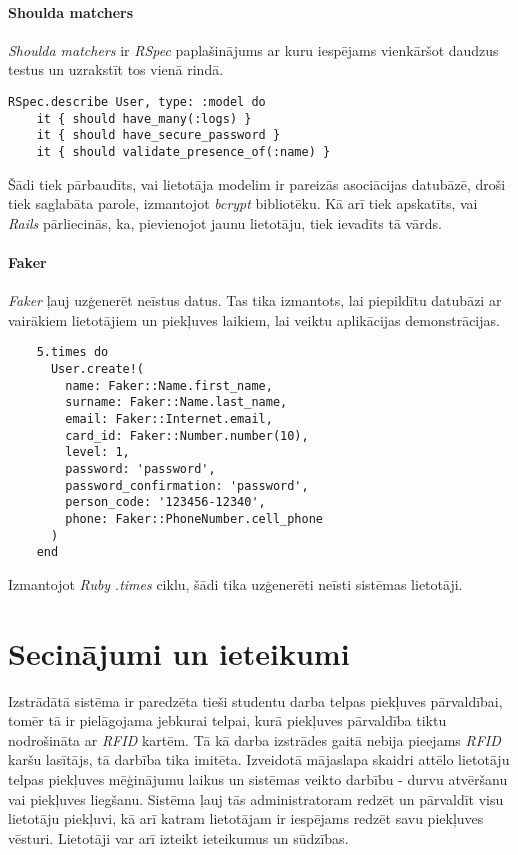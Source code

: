 \subsubsection{Shoulda matchers}
\textit{Shoulda matchers} ir \textit{RSpec} paplašinājums ar kuru iespējams vienkāršot daudzus testus un uzrakstīt tos vienā rindā.
\begin{lstlisting}
RSpec.describe User, type: :model do
	it { should have_many(:logs) }
	it { should have_secure_password }
	it { should validate_presence_of(:name) }
\end{lstlisting}
Šādi tiek pārbaudīts, vai lietotāja modelim ir pareizās asociācijas datubāzē, droši tiek saglabāta parole, izmantojot \textit{bcrypt} bibliotēku. Kā arī tiek apskatīts, vai \textit{Rails} pārliecinās, ka, pievienojot jaunu lietotāju, tiek ievadīts tā vārds.

\subsubsection{Faker}
\textit{Faker} ļauj uzģenerēt neīstus datus. Tas tika izmantots, lai piepildītu datubāzi ar vairākiem lietotājiem un piekļuves laikiem, lai veiktu aplikācijas demonstrācijas.
\begin{lstlisting}
	5.times do
	  User.create!(
	    name: Faker::Name.first_name,
	    surname: Faker::Name.last_name,
	    email: Faker::Internet.email,
	    card_id: Faker::Number.number(10),
	    level: 1,
	    password: 'password',
	    password_confirmation: 'password',
	    person_code: '123456-12340',
	    phone: Faker::PhoneNumber.cell_phone
	  )
	end
\end{lstlisting}
Izmantojot \textit{Ruby} \textit{.times} ciklu, šādi tika uzģenerēti neīsti sistēmas lietotāji.

\chapter{Secinājumi un ieteikumi}
Izstrādātā sistēma ir paredzēta tieši studentu darba telpas piekļuves pārvaldībai, tomēr tā ir pielāgojama jebkurai telpai, kurā piekļuves pārvaldība tiktu nodrošināta ar \textit{RFID} kartēm. Tā kā darba izstrādes gaitā nebija pieejams \textit{RFID} karšu lasītājs, tā darbība tika imitēta.
Izveidotā mājaslapa skaidri attēlo lietotāju telpas piekļuves mēģinājumu laikus
un sistēmas veikto darbību - durvu atvēršanu vai piekļuves liegšanu. Sistēma ļauj tās administratoram redzēt un pārvaldīt visu lietotāju piekļuvi, kā arī katram lietotājam ir iespējams redzēt savu piekļuves vēsturi. Lietotāji var arī izteikt ieteikumus un sūdzības.

